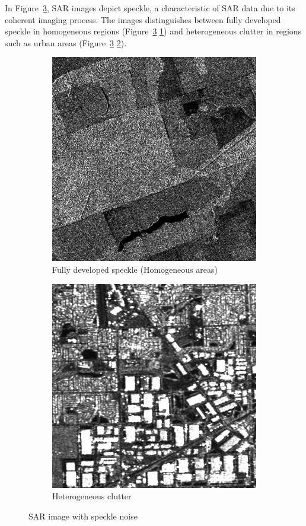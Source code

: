 In Figure~\ref{fig:speckle}, SAR images depict speckle, a characteristic of SAR data due to its coherent imaging process. 
The images distinguishes between fully developed speckle in homogeneous regions (Figure~\ref{fig:speckle} \ref{fig:s1}) and heterogeneous clutter in regions such as urban areas (Figure~\ref{fig:speckle} \ref{fig:s2}).
\begin{figure}[H]
  \centering
  \begin{subfigure}[b]{0.48\textwidth}
    \centering
    \includegraphics[width=.8\textwidth]{../../Images/PNG/Intensity_MG.png}
    \caption{Fully developed speckle (Homogeneous areas)}
    \label{fig:s1}
  \end{subfigure}
  \hfill
  \begin{subfigure}[b]{0.45\textwidth}
    \centering
    \includegraphics[width=.85\textwidth]{../../Images/PNG/urban_intensity.png}
    \caption{Heterogeneous clutter }
    \label{fig:s2}
  \end{subfigure}
  \caption{SAR image with speckle noise}
  \label{fig:speckle}
\end{figure}

